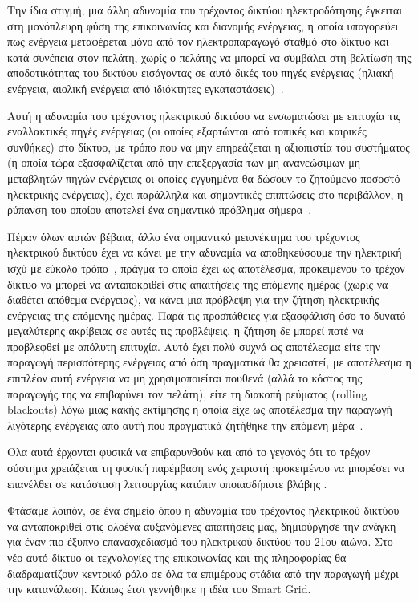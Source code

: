 \documentclass[12pt, a4paper, oneside]{report}
\begin{document}
Την ίδια στιγμή, μια άλλη αδυναμία του τρέχοντος δικτύου ηλεκτροδότησης έγκειται στη μονόπλευρη φύση της επικοινωνίας και διανομής ενέργειας, η οποία υπαγορεύει πως ενέργεια μεταφέρεται μόνο από τον ηλεκτροπαραγωγό σταθμό στο δίκτυο και κατά συνέπεια στον πελάτη, χωρίς ο πελάτης να μπορεί να συμβάλει στη βελτίωση της αποδοτικότητας του δικτύου εισάγοντας σε αυτό δικές του πηγές ενέργειας (ηλιακή ενέργεια, αιολική ενέργεια από ιδιόκτητες εγκαταστάσεις)~\cite{11}.

Αυτή η αδυναμία του τρέχοντος ηλεκτρικού δικτύου να ενσωματώσει με επιτυχία τις εναλλακτικές πηγές ενέργειας (οι οποίες εξαρτώνται από τοπικές και καιρικές συνθήκες) στο δίκτυο, με τρόπο που να μην επηρεάζεται η αξιοπιστία του συστήματος (η οποία τώρα εξασφαλίζεται από την επεξεργασία των μη ανανεώσιμων μη μεταβλητών πηγών ενέργειας οι οποίες εγγυημένα θα δώσουν το ζητούμενο ποσοστό ηλεκτρικής ενέργειας), έχει παράλληλα και σημαντικές επιπτώσεις στο περιβάλλον, η ρύπανση του οποίου αποτελεί ένα σημαντικό πρόβλημα σήμερα~\cite{12}.

Πέραν όλων αυτών βέβαια, άλλο ένα σημαντικό μειονέκτημα του τρέχοντος ηλεκτρικού δικτύου έχει να κάνει με την αδυναμία να αποθηκεύσουμε την ηλεκτρική ισχύ με εύκολο τρόπο~\cite{13}, πράγμα το οποίο έχει ως αποτέλεσμα, προκειμένου το τρέχον δίκτυο να μπορεί να ανταποκριθεί στις απαιτήσεις της επόμενης ημέρας (χωρίς να διαθέτει απόθεμα ενέργειας), να κάνει μια πρόβλεψη για την ζήτηση ηλεκτρικής ενέργειας της επόμενης ημέρας. Παρά τις προσπάθειες για εξασφάλιση όσο το δυνατό μεγαλύτερης ακρίβειας σε αυτές τις προβλέψεις, η ζήτηση δε μπορεί ποτέ να προβλεφθεί με απόλυτη επιτυχία. Αυτό έχει πολύ συχνά ως αποτέλεσμα είτε την παραγωγή περισσότερης ενέργειας από όση πραγματικά θα χρειαστεί, με αποτέλεσμα η επιπλέον αυτή ενέργεια να μη χρησιμοποιείται πουθενά (αλλά το κόστος της παραγωγής της να επιβαρύνει τον πελάτη), είτε τη διακοπή ρεύματος (rolling blackouts) λόγω μιας κακής εκτίμησης η οποία είχε ως αποτέλεσμα την παραγωγή λιγότερης ενέργειας από αυτή που πραγματικά ζητήθηκε την επόμενη μέρα~\cite{12}.

Όλα αυτά έρχονται φυσικά να επιβαρυνθούν και από το γεγονός ότι το τρέχον σύστημα χρειάζεται τη φυσική παρέμβαση ενός χειριστή προκειμένου να μπορέσει να επανέλθει σε κατάσταση λειτουργίας κατόπιν οποιασδήποτε βλάβης \cite{15}.

Φτάσαμε λοιπόν, σε ένα σημείο όπου η αδυναμία του τρέχοντος ηλεκτρικού δικτύου να ανταποκριθεί στις ολοένα αυξανόμενες απαιτήσεις μας, δημιούργησε την ανάγκη για έναν πιο έξυπνο επανασχεδιασμό του ηλεκτρικού δικτύου του 21ου αιώνα. Στο νέο αυτό δίκτυο οι τεχνολογίες της επικοινωνίας και της πληροφορίας θα διαδραματίζουν κεντρικό ρόλο σε όλα τα επιμέρους στάδια από την παραγωγή μέχρι την κατανάλωση. Κάπως έτσι γεννήθηκε η ιδέα του Smart Grid.
\end{document}
